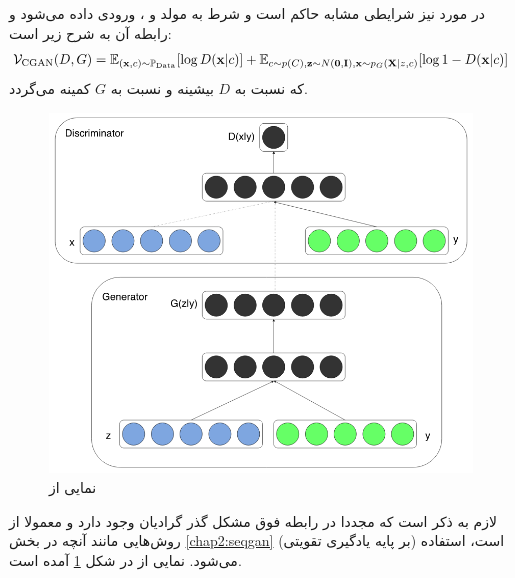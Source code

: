 \subsection{\cgan{}}
در مورد\gan{} نیز شرایطی مشابه \cvae{} حاکم است و شرط به مولد و \discriminator{}، ورودی داده می‌شود \cite{cgan} و رابطه آن به شرح زیر است:
\begin{align}
	{\mathcal{V}}_\text{CGAN}(D, G) =
	\mathbb E_{({\bf x}, c) \sim \mathbb P_\text{Data}} [\log D({\bf x}|c)] +
	\mathbb E_{c \sim p(C), {\bf z} \sim N({\bf 0}, {\bf I}),{\bf x} \sim p_G({\bf X}|z,c)} [\log 1 - D({\bf x}|c)]
\end{align}
که نسبت به $D$ بیشینه و نسبت به $G$ کمینه می‌گردد.
\begin{figure}[H]
	\centering
	\includegraphics[width=.7\textwidth]{images/cgan.png}
	\caption{نمایی از \cgan{} \cite{cgan}}
    \label{fig:chap2:cgan}
\end{figure}
لازم به ذکر است که مجددا در رابطه فوق مشکل گذر گرادیان وجود دارد و معمولا از روش‌هایی مانند آنچه در بخش \ref{chap2:seqgan} (بر پایه یادگیری تقویتی) است، استفاده می‌شود. نمایی از \cgan{} در شکل \ref{fig:chap2:cgan} آمده است.

